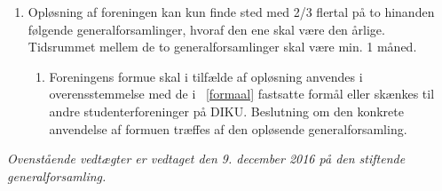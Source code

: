 \documentclass[a4paper]{article}
\newenvironment{stykenum}{
  \begin{enumerate}[%
    label=Stk.~\arabic*., ref=\textsection~\theenumi~Stk.~\arabic*, start=2]
}{\end{enumerate}}
\begin{document}
\begin{enumerate}[resume*=afsnit]

\item \label{oploesning} Opløsning af foreningen kan kun finde sted med 2/3
flertal på to hinanden følgende generalforsamlinger, hvoraf den ene skal være
den årlige. Tidsrummet mellem de to generalforsamlinger skal være min. 1 måned.

  \begin{stykenum}

  \item Foreningens formue skal i tilfælde af opløsning anvendes i
        over\-ensstemmelse med de i \textsection~\ref{formaal} fastsatte formål
        eller skænkes til andre studenterforeninger på DIKU. Beslutning om den
        konkrete anvendelse af formuen træffes af den opløsende
        generalforsamling.

  \end{stykenum}

\end{enumerate}


\bigskip

\begin{center}

\emph{Ovenstående vedtægter er vedtaget den 9. december 2016 på den stiftende
generalforsamling.}

\end{center}
\end{document}
